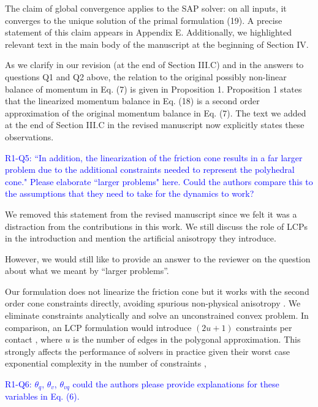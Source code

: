 The claim of global convergence applies to the SAP solver: on all inputs, it
converges to the unique solution of the primal formulation (19). A precise
statement of this claim appears in Appendix E. Additionally, we highlighted
relevant text in the main body of the manuscript at the beginning of Section IV.

As we clarify in our revision (at the end of Section III.C) and in the answers
to questions Q1 and Q2 above, the relation to the original possibly non-linear
balance of momentum in Eq. (7) is given in Proposition 1. Proposition 1 states
that the linearized momentum balance in Eq. (18) is a second order approximation
of the original momentum balance in Eq. (7). The text we added at the end of
Section III.C in the revised manuscript now explicitly states these
observations.
\vspace{5mm}

\textcolor{blue}{R1-Q5: ``In addition, the linearization of the friction cone
results in a far larger problem due to the additional constraints needed to
represent the polyhedral cone." Please elaborate ``larger problems" here. Could
the authors compare this to the assumptions that they need to take for the
dynamics to work?}

We removed this statement from the revised manuscript since we felt it was a
distraction from the contributions in this work. We still discuss the
role of LCPs in the introduction and mention the artificial anisotropy they
introduce.

However, we would still like to provide an answer to the reviewer on the
question about what we meant by ``larger problems''.

Our formulation does not linearize the friction cone but it works with the
second order cone constraints directly, avoiding spurious non-physical
anisotropy \cite{bib:li2018implicit}. We eliminate constraints analytically and
solve an unconstrained convex problem. In comparison, an LCP formulation would
introduce $(2u+1)$ constraints per contact \cite{bib:anitescu1997}, where $u$ is
the number of edges in the polygonal approximation. This strongly affects the
performance of solvers in practice given their worst case exponential complexity
in the number of constraints
\cite{bib:baraff1994fast},\cite{bib:erleben2007velocity}

\vspace{5mm}

\textcolor{blue}{R1-Q6: $\theta_q$, $\theta_v$, $\theta_{vq}$ could the authors
please provide explanations for these variables in Eq. (6).}

